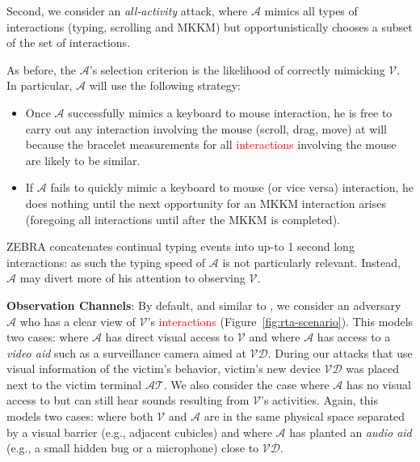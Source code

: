 \documentclass[conference]{IEEEtran}
\newcommand{\zebra}{ZEBRA\xspace}
\newcommand{\allactivity}{all-activity\xspace}
\newcommand{\attacker}{$\mathcal{A}$\xspace}
\newcommand{\victim}{$\mathcal{V}$\xspace}
\newcommand{\attackedterminal}{$\mathcal{AT}$\xspace}
\newcommand{\victimdevice}{$\mathcal{VD}$\xspace}
\newif\ifllncs
\newcommand\changeAsokan[1]{\textcolor{red}{#1}}
\newcommand\changeAsokan[1]{{#1}}
\begin{document}
Second, we consider an \textit{\allactivity} attack, where 
\attacker mimics
all types of interactions (typing, scrolling and MKKM) but
opportunistically chooses a subset of the set of interactions.
\ifllncs
This opportunistic strategy is described in detail in Appendix~\ref{app:extra_attackers}.
\else
As before, the \attacker's selection
criterion is the likelihood of correctly mimicking \victim. In
particular, \attacker will use the following strategy:
\begin{itemize}
\itemsep0em
\item Once \attacker successfully mimics a keyboard to mouse interaction, he
  is free to carry out any interaction involving the mouse (scroll,
  drag, move) at will because the bracelet measurements for all
  \changeAsokan{interactions} involving the mouse are likely to be similar.
\item If \attacker fails to quickly mimic a keyboard to mouse (or vice
  versa) interaction, he
  does nothing until the next opportunity for an MKKM
  interaction arises (foregoing all interactions until after the MKKM
  is completed).
\end{itemize}
\fi


\zebra concatenates continual typing events into up-to 1 second long interactions: as such the typing speed of \attacker is not particularly relevant. Instead, \attacker may divert more of his attention to observing \victim.


\vspace{1mm}
\noindent\textbf{Observation Channels}: By default, and similar to \cite{mare2014zebra}, we consider an adversary \attacker who has a
clear view of \victim's \changeAsokan{interactions} (Figure~\ref{fig:rta-scenario}). This models two cases: where \attacker has direct visual access to \victim and where \attacker has access to a \textit{video aid} such as a surveillance camera aimed at \victimdevice. During our attacks that use visual information of the victim's behavior, victim's new device \victimdevice was placed next to the victim terminal \attackedterminal. We also consider the case where \attacker has no visual access to but can still hear sounds resulting from \victim's activities. Again, this models two cases: where both \victim and \attacker are in the same physical space separated by a visual barrier (e.g., adjacent cubicles) and where \attacker has planted an \textit{audio aid} (e.g., a small hidden bug or a microphone) close to \victimdevice. 
\end{document}
